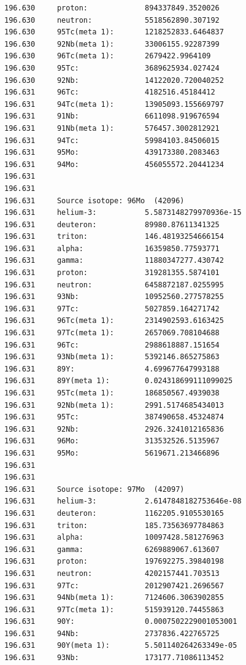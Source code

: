 \begin{lstlisting}[style=sOutputFile,caption={Final results for Molybdenum Irradiation},label={listing:activityv2molybdenum}]
196.630     proton:             894337849.3520026
196.630     neutron:            5518562890.307192
196.630     95Tc(meta 1):       1218252833.6464837
196.630     92Nb(meta 1):       33006155.92287399
196.630     96Tc(meta 1):       2679422.9964109
196.630     95Tc:               3689625934.027424
196.630     92Nb:               14122020.720040252
196.631     96Tc:               4182516.45184412
196.631     94Tc(meta 1):       13905093.155669797
196.631     91Nb:               6611098.919676594
196.631     91Nb(meta 1):       576457.3002812921
196.631     94Tc:               59984103.84506015
196.631     95Mo:               439173380.2083463
196.631     94Mo:               456055572.20441234
196.631     
196.631     
196.631     Source isotope: 96Mo  (42096)
196.631     helium-3:           5.5873148279970936e-15
196.631     deuteron:           89980.87611341325
196.631     triton:             146.48193254666154
196.631     alpha:              16359850.77593771
196.631     gamma:              11880347277.430742
196.631     proton:             319281355.5874101
196.631     neutron:            6458872187.0255995
196.631     93Nb:               10952560.277578255
196.631     97Tc:               5027859.164271742
196.631     96Tc(meta 1):       2314902593.6163425
196.631     97Tc(meta 1):       2657069.708104688
196.631     96Tc:               2988618887.151654
196.631     93Nb(meta 1):       5392146.865275863
196.631     89Y:                4.699677647993188
196.631     89Y(meta 1):        0.024318699111099025
196.631     95Tc(meta 1):       186850567.4939038
196.631     92Nb(meta 1):       2991.5174685434013
196.631     95Tc:               387490658.45324874
196.631     92Nb:               2926.3241012165836
196.631     96Mo:               313532526.5135967
196.631     95Mo:               5619671.213466896
196.631     
196.631     
196.631     Source isotope: 97Mo  (42097)
196.631     helium-3:           2.6147848182753646e-08
196.631     deuteron:           1162205.9105530165
196.631     triton:             185.73563697784863
196.631     alpha:              10097428.581276963
196.631     gamma:              6269889067.613607
196.631     proton:             197692275.39840198
196.631     neutron:            4202157441.703513
196.631     97Tc:               2012907421.2696567
196.631     94Nb(meta 1):       7124606.3063902855
196.631     97Tc(meta 1):       515939120.74455863
196.631     90Y:                0.0007502229001053001
196.631     94Nb:               2737836.422765725
196.631     90Y(meta 1):        5.501140264263349e-05
196.631     93Nb:               173177.71086113452

\end{lstlisting}

